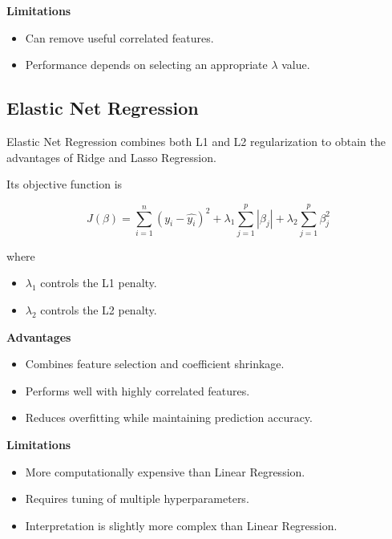 \documentclass{article}
\begin{document}
\textbf{Limitations}

\begin{itemize}
\item Can remove useful correlated features.
\item Performance depends on selecting an appropriate $\lambda$ value.
\end{itemize}


\subsection{Elastic Net Regression}

Elastic Net Regression combines both L1 and L2 regularization to obtain the advantages of Ridge and Lasso Regression.

Its objective function is

\[
J(\beta)=
\sum_{i=1}^{n}(y_i-\hat{y_i})^2
+
\lambda_1
\sum_{j=1}^{p}|\beta_j|
+
\lambda_2
\sum_{j=1}^{p}\beta_j^2
\]

where

\begin{itemize}
\item $\lambda_1$ controls the L1 penalty.
\item $\lambda_2$ controls the L2 penalty.
\end{itemize}

\textbf{Advantages}

\begin{itemize}
\item Combines feature selection and coefficient shrinkage.
\item Performs well with highly correlated features.
\item Reduces overfitting while maintaining prediction accuracy.
\end{itemize}

\textbf{Limitations}

\begin{itemize}
\item More computationally expensive than Linear Regression.
\item Requires tuning of multiple hyperparameters.
\item Interpretation is slightly more complex than Linear Regression.
\end{itemize}

\end{document}
